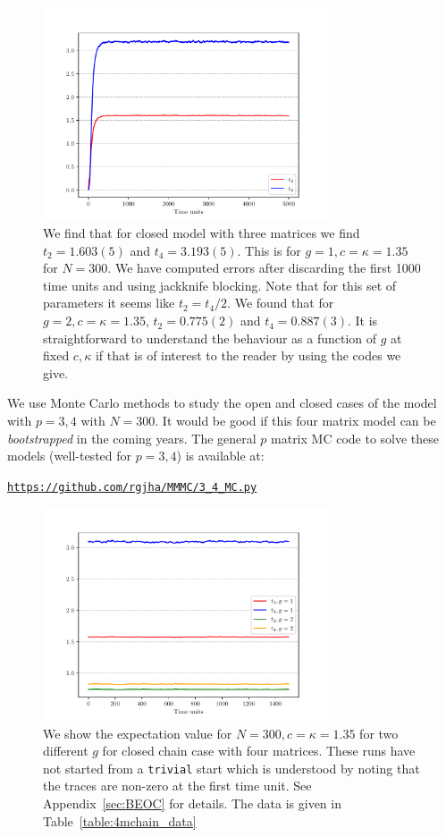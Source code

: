 \documentclass[11pt]{article}
\begin{document}
\begin{figure}[htbp] 
	\centering 
	\includegraphics[width=0.75\textwidth]{figs/3MM_closed.pdf}
	\caption{\label{fig:3MM_closed}We find that for closed model with three matrices we find $t_{2} = 1.603(5)$ and $t_{4} = 3.193(5)$. 
	This is for $g=1, c=\kappa=1.35$ for $N=300$. We have computed errors after discarding the first 1000 time units and 
	using jackknife blocking. Note that for this set of parameters it seems like $t_{2} = t_{4}/2$. We found that 
	for $g=2, c=\kappa=1.35$, $t_{2} = 0.775(2)$ and $t_{4} = 0.887(3)$. It is straightforward to understand the behaviour as a function of $g$ at fixed $c, \kappa$ if that is of interest to the reader by using the codes we give.}
\end{figure}
We use Monte Carlo methods to study the open and closed cases of the model with $p = 3,4$ with 
$N = 300$. It would be good if this four matrix model can be \textit{bootstrapped} in the coming years. 
The general $p$ matrix MC code to solve these models 
(well-tested for $p = 3,4$) is available at: 
\begin{center} \texttt{\href{https://github.com/rgjha/MMMC/3\_4\ _MC.py}{https://github.com/rgjha/MMMC/3\_4\_MC.py}} \end{center}

\begin{figure}[htbp] 
	\centering 
	\includegraphics[width=0.75\textwidth]{figs/4MM_g1_g2.pdf}
\caption{\label{fig:4MM_closed1} We show the expectation value for $N=300, c=\kappa=1.35$ for two different $g$ for closed chain case with four matrices. These runs have not started from a \texttt{trivial} start
	which is understood by noting that the traces are non-zero at the first time unit. See Appendix~\ref{sec:BEOC} for details. The data is given in Table~\ref{table:4mchain_data}}
\end{figure}
\end{document}
